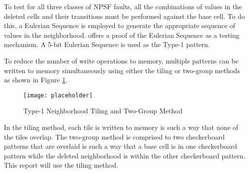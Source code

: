 To test for all three classes of NPSF faults, all the combinations of values in the deleted cells and their transitions must be performed against the base cell.  To do this, a Eulerian Sequence is employed to generate the appropriate sequence of values in the neighborhood.  \cite{1675556} offers a proof of the Eulerian Sequence as a testing mechanism.  A 5-bit Eulerian Sequence is used as the Type-1 pattern.

To reduce the number of write operations to memory, multiple patterns can be written to memory simultaneously using either the tiling or two-group methods as shown in Figure \ref{fig:type1methods}.

\begin{figure}[h]
  \centering
  \texttt{[image: placeholder]}
  \caption{Type-1 Neighborhood Tiling and Two-Group Method}
  \label{fig:type1methods}
\end{figure}

In the tiling method, each tile is written to memory is such a way that none of the tiles overlap.  The two-group method is comprised to two checkerboard patterns that are overlaid is such a way that a base cell is in one checkerboard pattern while the deleted neighborhood is within the other checkerboard pattern.  This report will use the tiling method.
